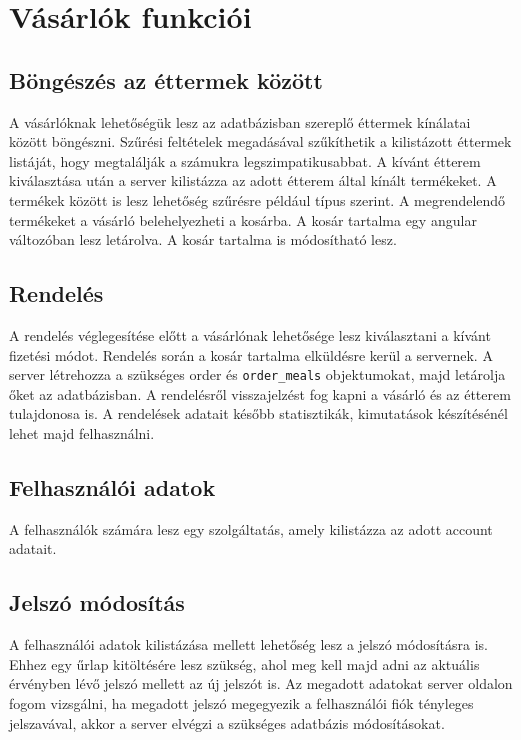 \section{Vásárlók funkciói}

\subsection{Böngészés az éttermek között}

A vásárlóknak lehetőségük lesz az adatbázisban szereplő éttermek kínálatai között böngészni. Szűrési feltételek megadásával szűkíthetik a kilistázott éttermek listáját, hogy megtalálják a számukra legszimpatikusabbat.
A kívánt étterem kiválasztása után a server kilistázza az adott étterem által kínált termékeket. A termékek között is lesz lehetőség szűrésre például típus szerint. A megrendelendő termékeket a vásárló belehelyezheti a kosárba. A kosár tartalma egy angular változóban lesz letárolva. A kosár tartalma is módosítható lesz.

\subsection{Rendelés}

A rendelés véglegesítése előtt a vásárlónak lehetősége lesz kiválasztani a kívánt fizetési módot. Rendelés során a kosár tartalma elküldésre kerül a servernek. A server létrehozza a szükséges order és \texttt{order\_meals} objektumokat, majd letárolja őket az adatbázisban. A rendelésről visszajelzést fog kapni a vásárló és az étterem tulajdonosa is. A rendelések adatait később statisztikák, kimutatások készítésénél lehet majd felhasználni.

\subsection{Felhasználói adatok}

A felhasználók számára lesz egy szolgáltatás, amely kilistázza az adott account adatait.

\subsection{Jelszó módosítás}

A felhasználói adatok kilistázása mellett lehetőség lesz a jelszó módosításra is. Ehhez egy űrlap kitöltésére lesz szükség, ahol meg kell majd adni az aktuális érvényben lévő jelszó mellett az új jelszót is. Az megadott adatokat server oldalon fogom vizsgálni, ha megadott jelszó megegyezik a felhasználói fiók tényleges jelszavával, akkor a server elvégzi a szükséges adatbázis módosításokat.

